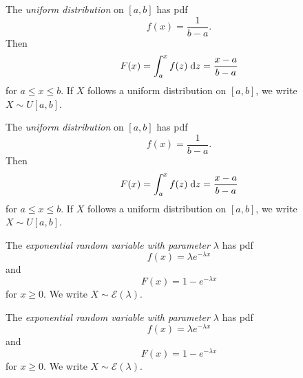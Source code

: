 \begin{note}
  \begin{field}
    \begin{defi}
      The \emph{uniform distribution} on $[a, b]$ has pdf
      \[
        f(x) = \frac{1}{b - a}.
      \]
      Then
      \[
        F(x) = \int_a^x f(z)\;\mathrm{d} z = \frac{x - a}{b - a}
      \]
      for $a \leq x \leq b$.
      If $X$ follows a uniform distribution on $[a, b]$, we write $X\sim U[a, b]$.
    \end{defi}
  \end{field}
  \begin{field}
    \begin{defi}
      The \emph{uniform distribution} on $[a, b]$ has pdf
      \[
        f(x) = \frac{1}{b - a}.
      \]
      Then
      \[
        F(x) = \int_a^x f(z)\;\mathrm{d} z = \frac{x - a}{b - a}
      \]
      for $a \leq x \leq b$.
      If $X$ follows a uniform distribution on $[a, b]$, we write $X\sim U[a, b]$.
    \end{defi}
  \end{field}
  \xplain{}%
\end{note}

\begin{note}
  \begin{field}
    \begin{defi}
      The \emph{exponential random variable with parameter $\lambda$} has pdf
      \[
        f(x) = \lambda e^{-\lambda x}
      \]
      and
      \[
        F(x) = 1 - e^{-\lambda x}
      \]
      for $x \geq 0$.
      We write $X \sim \mathcal{E}(\lambda)$.
    \end{defi}
  \end{field}
  \begin{field}
    \begin{defi}
      The \emph{exponential random variable with parameter $\lambda$} has pdf
      \[
        f(x) = \lambda e^{-\lambda x}
      \]
      and
      \[
        F(x) = 1 - e^{-\lambda x}
      \]
      for $x \geq 0$.
      We write $X \sim \mathcal{E}(\lambda)$.
    \end{defi}
  \end{field}
  \xplain{}%
\end{note}


